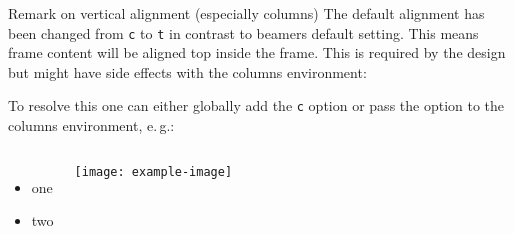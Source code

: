 \documentclass[
	english, %
	design=2023, %
	]{tudabeamer}
\newcommand*{\code}[1]{\texttt{#1}}
\begin{document}
\begin{frame}{Remark on vertical alignment (especially columns)}
	The default alignment has been changed from \code{c} to \code{t} in contrast to beamers default setting.
	This means frame content will be aligned top inside the frame. 
	This is required by the design but might have side effects with the columns environment:
	
	To resolve this one can either globally add the \code{c} option or pass the option to the columns environment, e.\,g.:

\begin{columns}[onlytextwidth,c]
	\begin{itemize}
		\item one
		\item two
	\end{itemize}
	\texttt{[image: example-image]}
\end{columns}
\end{frame}
\end{document}
